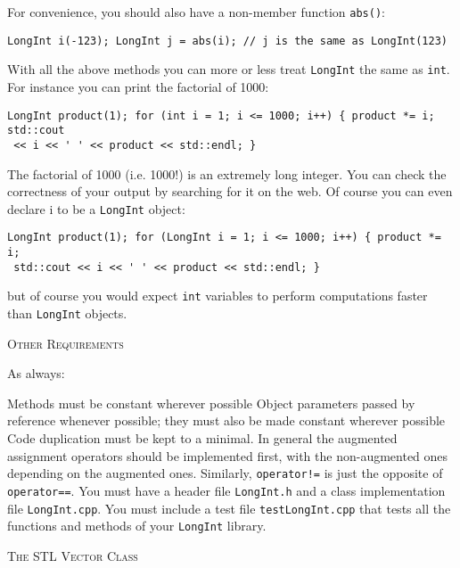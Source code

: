 For convenience, you should also have a non-member function \verb!abs()!:

\begin{Verbatim}[fontsize=\footnotesize,frame=single]
LongInt i(-123); LongInt j = abs(i); // j is the same as LongInt(123)
\end{Verbatim}

With all the above methods you can more or less treat \verb!LongInt! the same
as \verb!int!. For instance you can print the factorial of 1000:

\begin{Verbatim}[fontsize=\footnotesize,frame=single]
LongInt product(1); for (int i = 1; i <= 1000; i++) { product *= i; std::cout
 << i << ' ' << product << std::endl; }
\end{Verbatim}

The factorial of 1000 (i.e. 1000!) is an extremely long integer. You can check
the correctness of your output by searching for it on the web.  Of course you
can even declare i to be a \verb!LongInt! object:

\begin{Verbatim}[fontsize=\footnotesize,frame=single]
LongInt product(1); for (LongInt i = 1; i <= 1000; i++) { product *= i;
 std::cout << i << ' ' << product << std::endl; }
\end{Verbatim}

but of course you would expect \verb!int! variables to perform computations
faster than \verb!LongInt! objects.

\textsc{Other Requirements}

As always:
\begin{tightlist}
    \li Methods must be constant wherever possible \li Object parameters passed
    by reference whenever possible; they must also be made constant wherever
    possible \li Code duplication must be kept to a minimal. In general the
    augmented assignment operators should be implemented first, with the
    non-augmented ones depending on the augmented ones.  Similarly,
    \texttt{operator!=} is just the opposite of \verb!operator==!.  \li You
    must have a header file \verb!LongInt.h! and a class implementation file
    \verb!LongInt.cpp!.  \li You must include a test file
    \verb!testLongInt.cpp! that tests all the functions and methods of your
    \verb!LongInt! library.
\end{tightlist}


\newpage
\textsc{The STL Vector Class}

